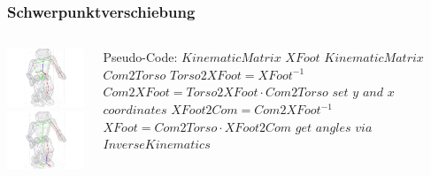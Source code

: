 \documentclass[]{beamer}
\begin{document}
\begin{frame}
	\frametitle{Schwerpunktverschiebung}
	\begin{columns}

		\includegraphics[width=4.7cm]{comtorso}
		\newline\newline
		\includegraphics[width=4.7cm]{comfoot}
		
		\column{0.7\textwidth}
		Pseudo-Code:
		\newline\newline
		$KinematicMatrix$ $XFoot$
		$KinematicMatrix$ $Com2Torso$
		\newline\newline
		$Torso2XFoot = XFoot^{-1}$	
		$Com2XFoot = Torso2XFoot \cdot Com2Torso$					
		\newline\newline
		$set$ $y$ $and$ $x$ $coordinates$
		\newline\newline
		$XFoot2Com = Com2XFoot^{-1}$
		$XFoot = Com2Torso \cdot XFoot2Com$
		\newline\newline
		$get$ $angles$ $via$ $InverseKinematics$
	\end{columns}
\end{frame}
\end{document}
